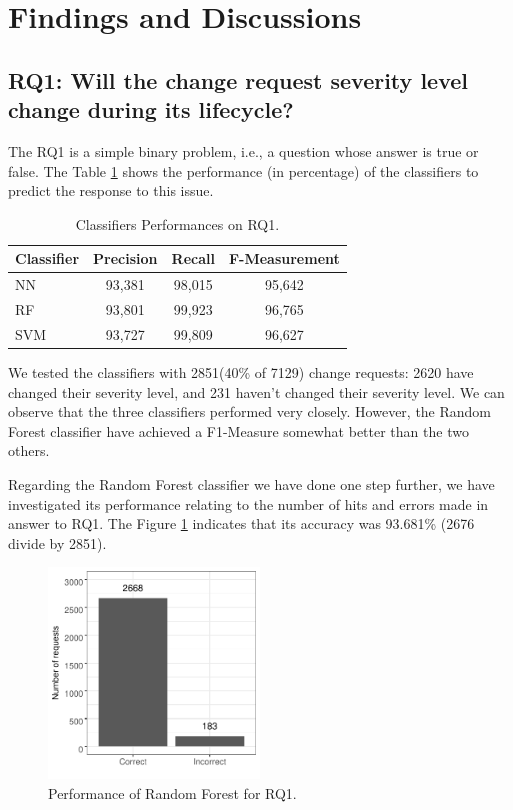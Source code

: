 \documentclass[10pt, conference]{IEEEtran}
\begin{document}
\section{Findings and Discussions}

\subsection{RQ1: Will the change request severity level change during its lifecycle?}

The RQ1 is a simple binary problem, i.e., a question whose answer is true or false. The Table \ref{tab:metrics_for_rq1} shows the performance (in percentage) of the classifiers to predict the response to this issue.

\begin{table}[!ht]
	\renewcommand{\arraystretch}{1.3}
	\caption{Classifiers Performances on RQ1.}
	\label{tab:metrics_for_rq1}
	\centering
	\begin{tabular}{|l|c|c|c|}
		\hline
		Classifier & Precision & Recall & F-Measurement\\
		\hline 
		NN & 93,381 & 98,015 & 95,642\\
		\hline
		RF & 93,801 & 99,923 & 96,765\\
        \hline
		SVM & 93,727 & 99,809 & 96,627 \\
		\hline
		
	\end{tabular}
\end{table}

We tested the classifiers with 2851(40\% of 7129) change requests: 2620 have changed their severity level, and 231 haven't changed their severity level. We can observe that the three classifiers performed very closely. However, the Random Forest classifier have achieved a F1-Measure somewhat better than the two others.

Regarding the Random Forest classifier we have done one step further, we have investigated its performance relating to the number of hits and errors made in answer to RQ1. The Figure \ref{fig:rf_performance_for_q1} indicates that its accuracy was 93.681\% (2676 divide by 2851). 

\begin{figure}[!hbt]
  \label{fig:rf_performance_for_q1}
  \includegraphics[width=0.5\textwidth, height=0.42\textwidth]{figures/rf_performance_for_q1.pdf}
  \caption{Performance of Random Forest for RQ1.}
\end{figure}
\end{document}
